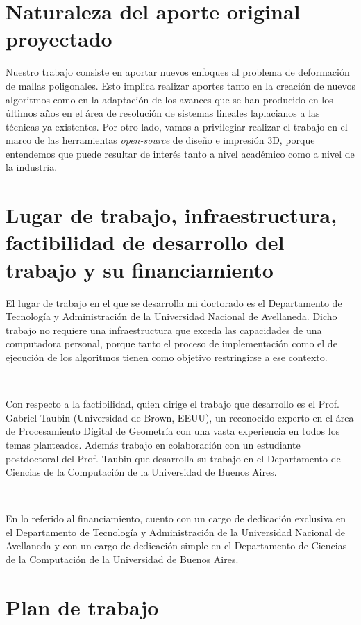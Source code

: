 \documentclass{article}
\begin{document}
\section{Naturaleza del aporte original proyectado}

Nuestro trabajo consiste en aportar nuevos enfoques al problema de 
deformación de mallas poligonales. Esto implica realizar aportes tanto en 
la creación de nuevos algoritmos como en la adaptación de los avances 
que se han producido en los últimos años en el área de resolución de 
sistemas lineales laplacianos a las técnicas ya existentes. Por otro lado, 
vamos a privilegiar realizar el trabajo en el marco de las herramientas 
\emph{open-source} de diseño e impresión 3D, porque entendemos que puede 
resultar de interés tanto a nivel académico como a nivel de la industria. 

\section{Lugar de trabajo, infraestructura, factibilidad de desarrollo del trabajo y su financiamiento}

El lugar de trabajo en el que se desarrolla mi doctorado es el Departamento 
de Tecnología y Administración de la Universidad Nacional de Avellaneda. 
Dicho trabajo no requiere una infraestructura que exceda las capacidades 
de una computadora personal, porque tanto el proceso de implementación como 
el de ejecución de los algoritmos tienen como objetivo restringirse a ese 
contexto.

\

Con respecto a la factibilidad, quien dirige el trabajo que desarrollo es 
el Prof. Gabriel Taubin (Universidad de Brown, EEUU), un reconocido experto 
en el área de Procesamiento Digital de Geometría con una vasta experiencia 
en todos los temas planteados. Además trabajo en colaboración 
con un estudiante postdoctoral del Prof. Taubin que desarrolla su trabajo 
en el Departamento de Ciencias de la Computación de la Universidad de Buenos 
Aires.


\

En lo referido al financiamiento, cuento con un cargo de dedicación exclusiva 
en el Departamento de Tecnología y Administración de la Universidad Nacional 
de Avellaneda y con un cargo de dedicación simple en el Departamento de Ciencias 
de la Computación de la Universidad de Buenos Aires.

\section{Plan de trabajo}
\end{document}
